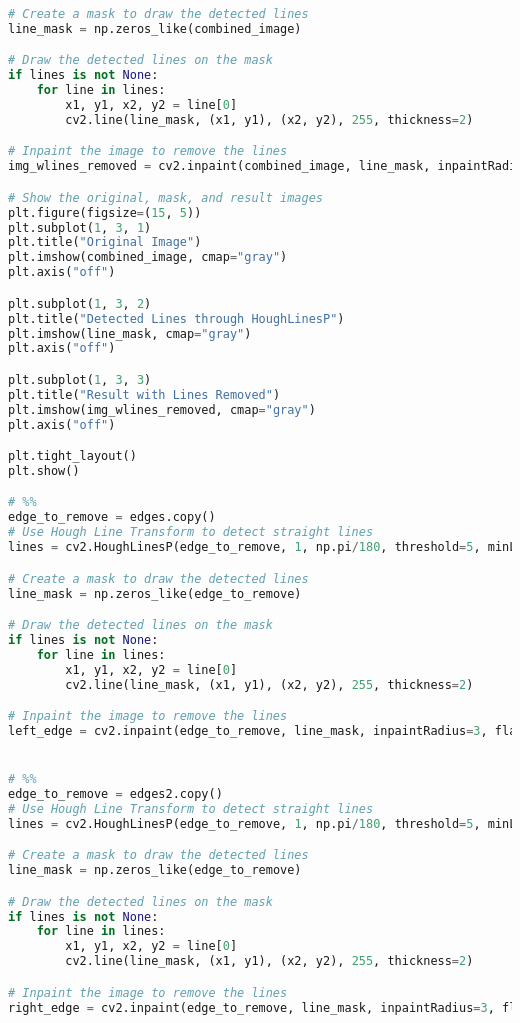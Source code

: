 \documentclass{article}
\begin{document}
\begin{lstlisting}[language=Python]
# Create a mask to draw the detected lines
line_mask = np.zeros_like(combined_image)

# Draw the detected lines on the mask
if lines is not None:
    for line in lines:
        x1, y1, x2, y2 = line[0]
        cv2.line(line_mask, (x1, y1), (x2, y2), 255, thickness=2)

# Inpaint the image to remove the lines
img_wlines_removed = cv2.inpaint(combined_image, line_mask, inpaintRadius=3, flags=cv2.INPAINT_TELEA)

# Show the original, mask, and result images
plt.figure(figsize=(15, 5))
plt.subplot(1, 3, 1)
plt.title("Original Image")
plt.imshow(combined_image, cmap="gray")
plt.axis("off")

plt.subplot(1, 3, 2)
plt.title("Detected Lines through HoughLinesP")
plt.imshow(line_mask, cmap="gray")
plt.axis("off")

plt.subplot(1, 3, 3)
plt.title("Result with Lines Removed")
plt.imshow(img_wlines_removed, cmap="gray")
plt.axis("off")

plt.tight_layout()
plt.show()

# %%
edge_to_remove = edges.copy()
# Use Hough Line Transform to detect straight lines
lines = cv2.HoughLinesP(edge_to_remove, 1, np.pi/180, threshold=5, minLineLength=40, maxLineGap=10)

# Create a mask to draw the detected lines
line_mask = np.zeros_like(edge_to_remove)

# Draw the detected lines on the mask
if lines is not None:
    for line in lines:
        x1, y1, x2, y2 = line[0]
        cv2.line(line_mask, (x1, y1), (x2, y2), 255, thickness=2)

# Inpaint the image to remove the lines
left_edge = cv2.inpaint(edge_to_remove, line_mask, inpaintRadius=3, flags=cv2.INPAINT_TELEA)


# %%
edge_to_remove = edges2.copy()
# Use Hough Line Transform to detect straight lines
lines = cv2.HoughLinesP(edge_to_remove, 1, np.pi/180, threshold=5, minLineLength=40, maxLineGap=10)

# Create a mask to draw the detected lines
line_mask = np.zeros_like(edge_to_remove)

# Draw the detected lines on the mask
if lines is not None:
    for line in lines:
        x1, y1, x2, y2 = line[0]
        cv2.line(line_mask, (x1, y1), (x2, y2), 255, thickness=2)

# Inpaint the image to remove the lines
right_edge = cv2.inpaint(edge_to_remove, line_mask, inpaintRadius=3, flags=cv2.INPAINT_TELEA)


\end{lstlisting}
\end{document}
